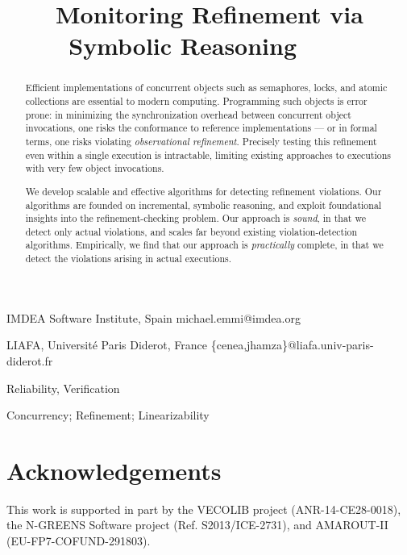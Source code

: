 \documentclass{sigplanconf}
\begin{document}
  \setlength{\pdfpageheight}{\paperheight}
  \setlength{\pdfpagewidth}{\paperwidth}


  \title{Monitoring Refinement via Symbolic Reasoning $\qquad$}

    {IMDEA Software Institute, Spain}
    {michael.emmi@imdea.org}

    {LIAFA, Université Paris Diderot, France}
    {\{cenea,jhamza\}@liafa.univ-paris-diderot.fr}

  \maketitle

  \begin{abstract}

    Efficient implementations of concurrent objects such as semaphores, locks,
    and atomic collections are essential to modern computing. Programming such
    objects is error prone: in minimizing the synchronization overhead between
    concurrent object invocations, one risks the conformance to reference
    implementations --- or in formal terms, one risks violating
    \emph{observational refinement}. Precisely testing this refinement even
    within a single execution is intractable, limiting existing approaches to
    executions with very few object invocations.

    We develop scalable and effective algorithms for detecting refinement
    violations. Our algorithms are founded on incremental, symbolic reasoning,
    and exploit foundational insights into the refinement-checking problem. Our
    approach is \emph{sound}, in that we detect only actual violations, and
    scales far beyond existing violation-detection algorithms. Empirically, we
    find that our approach is \emph{practically} complete, in that we detect
    the violations arising in actual executions.

  \end{abstract}
  

  \terms
  Reliability, Verification

  \keywords
  Concurrency; Refinement; Linearizability

  
  
  
  
  
  
  
  
  
  \section*{Acknowledgements}
  
  This work is supported in part by the VECOLIB project (ANR-14-CE28-0018), the
  N-GREENS Software project (Ref. S2013/ICE-2731), and AMAROUT-II
  (EU-FP7-COFUND-291803).

  
  
\end{document}
